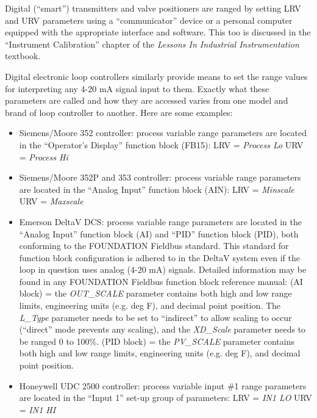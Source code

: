 Digital (``smart'') transmitters and valve positioners are ranged by setting LRV and URV parameters using a ``communicator'' device or a personal computer equipped with the appropriate interface and software.  This too is discussed in the ``Instrument Calibration'' chapter of the {\it Lessons In Industrial Instrumentation} textbook. 

\vskip 10pt

\filbreak

Digital electronic loop controllers similarly provide means to set the range values for interpreting any 4-20 mA signal input to them.  Exactly what these parameters are called and how they are accessed varies from one model and brand of loop controller to another.  Here are some examples:

\begin{itemize}
\item{} Siemens/Moore 352 controller: process variable range parameters are located in the ``Operator's Display'' function block (FB15):
\itemitem{} LRV = {\it Process Lo}
\itemitem{} URV = {\it Process Hi}
\vskip 10pt
\item{} Siemens/Moore 352P and 353 controller: process variable range parameters are located in the ``Analog Input'' function block (AIN):
\itemitem{} LRV = {\it Minscale}
\itemitem{} URV = {\it Maxscale}
\vskip 10pt
\item{} Emerson DeltaV DCS: process variable range parameters are located in the ``Analog Input'' function block (AI) and ``PID'' function block (PID), both conforming to the FOUNDATION Fieldbus standard.  This standard for function block configuration is adhered to in the DeltaV system even if the loop in question uses analog (4-20 mA) signals.  Detailed information may be found in any FOUNDATION Fieldbus function block reference manual:
\itemitem{} (AI block) = the {\it OUT\_SCALE} parameter contains both high and low range limits, engineering units (e.g. deg F), and decimal point position.  The {\it L\_Type} parameter needs to be set to ``indirect'' to allow scaling to occur (``direct'' mode prevents any scaling), and the {\it XD\_Scale} parameter needs to be ranged 0 to 100\%.
\itemitem{} (PID block) = the {\it PV\_SCALE} parameter contains both high and low range limits, engineering units (e.g. deg F), and decimal point position.
\vskip 10pt
\item{} Honeywell UDC 2500 controller: process variable input \#1 range parameters are located in the ``Input 1'' set-up group of parameters:
\itemitem{} LRV = {\it IN1 LO}
\itemitem{} URV = {\it IN1 HI}

\end{itemize}
